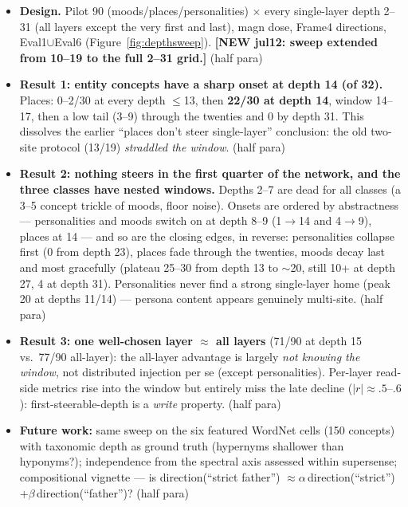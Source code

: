 \documentclass[11pt]{article}
\newenvironment{outline}{\color{gray!70!black}\begin{itemize}[leftmargin=1.2em,itemsep=1pt]}{\end{itemize}\color{black}}
\begin{document}
\begin{outline}
\item \textbf{Design.} Pilot 90 (moods/places/personalities) $\times$ every single-layer depth 2--31 (all layers except the very first and last), magn dose, Frame4 directions, Eval1$\cup$Eval6 (Figure~\ref{fig:depthsweep}). \textbf{[NEW jul12: sweep extended from 10--19 to the full 2--31 grid.]} (half para)
\item \textbf{Result 1: entity concepts have a sharp onset at depth 14 (of 32).} Places: 0--2/30 at every depth $\le$13, then \textbf{22/30 at depth 14}, window 14--17, then a low tail (3--9) through the twenties and 0 by depth 31. This dissolves the earlier ``places don't steer single-layer'' conclusion: the old two-site protocol (13/19) \emph{straddled the window}. (half para)
\item \textbf{Result 2: nothing steers in the first quarter of the network, and the three classes have nested windows.} Depths 2--7 are dead for all classes (a 3--5 concept trickle of moods, floor noise). Onsets are ordered by abstractness --- personalities and moods switch on at depth 8--9 (1$\to$14 and 4$\to$9), places at 14 --- and so are the closing edges, in reverse: personalities collapse first (0 from depth 23), places fade through the twenties, moods decay last and most gracefully (plateau 25--30 from depth 13 to $\sim$20, still 10+ at depth 27, 4 at depth 31). Personalities never find a strong single-layer home (peak 20 at depths 11/14) --- persona content appears genuinely multi-site. (half para)
\item \textbf{Result 3: one well-chosen layer $\approx$ all layers} (71/90 at depth 15 vs.\ 77/90 all-layer): the all-layer advantage is largely \emph{not knowing the window}, not distributed injection per se (except personalities). Per-layer read-side metrics rise into the window but entirely miss the late decline ($|r| \approx .5$--$.6$): first-steerable-depth is a \emph{write} property. (half para)
\item \textbf{Future work:} same sweep on the six featured WordNet cells (150 concepts) with taxonomic depth as ground truth (hypernyms shallower than hyponyms?); independence from the spectral axis assessed within supersense; compositional vignette --- is direction(``strict father'') $\approx \alpha\,$direction(``strict'') $+ \beta\,$direction(``father'')? (half para)
\end{outline}
\end{document}
